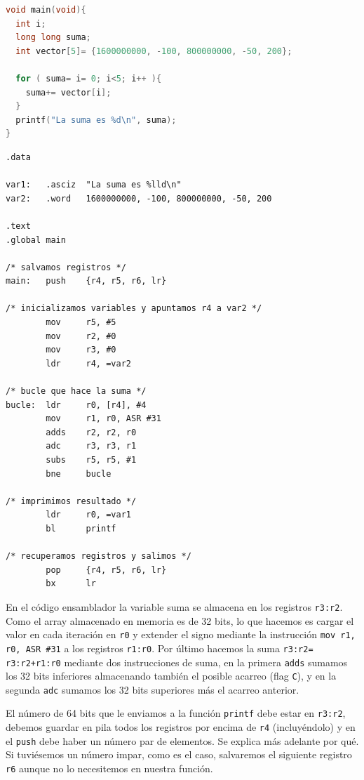 \begin{lstlisting}[language=C]
void main(void){
  int i;
  long long suma;
  int vector[5]= {1600000000, -100, 800000000, -50, 200};

  for ( suma= i= 0; i<5; i++ ){
    suma+= vector[i];
  }
  printf("La suma es %d\n", suma);
}
\end{lstlisting}

\begin{lstlisting}[caption={Suma de un vector de enteros largos (tipos6.s)},label={lst:dos_11}]
.data

var1:   .asciz  "La suma es %lld\n"
var2:   .word   1600000000, -100, 800000000, -50, 200

.text
.global main

/* salvamos registros */
main:   push    {r4, r5, r6, lr}

/* inicializamos variables y apuntamos r4 a var2 */
        mov     r5, #5
        mov     r2, #0
        mov     r3, #0
        ldr     r4, =var2

/* bucle que hace la suma */
bucle:  ldr     r0, [r4], #4
        mov     r1, r0, ASR #31
        adds    r2, r2, r0
        adc     r3, r3, r1
        subs    r5, r5, #1
        bne     bucle

/* imprimimos resultado */
        ldr     r0, =var1
        bl      printf

/* recuperamos registros y salimos */
        pop     {r4, r5, r6, lr}
        bx      lr
\end{lstlisting}

En el código ensamblador la variable suma se almacena en los registros {\tt r3:r2}.
Como el array almacenado en memoria es de 32 bits, lo que hacemos es cargar el valor
en cada iteración en {\tt r0} y extender el signo mediante la instrucción
{\tt mov r1, r0, ASR \#31} a los registros {\tt r1:r0}. Por último hacemos la suma
{\tt r3:r2= r3:r2+r1:r0} mediante dos instrucciones de suma, en la primera {\tt adds}
sumamos los 32 bits inferiores almacenando también el posible acarreo (flag {\tt C}),
y en la segunda {\tt adc} sumamos los 32 bits superiores más el acarreo anterior.

El número de 64 bits que
le enviamos a la función {\tt printf} debe estar en {\tt r3:r2}, debemos guardar en pila
todos los registros por encima de {\tt r4} (incluyéndolo) y en el {\tt push} debe
haber un número par de elementos. Se explica más adelante por qué. Si tuviésemos un número
impar, como es el caso, salvaremos el siguiente registro {\tt r6} aunque no lo
necesitemos en nuestra función.

